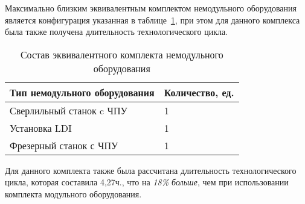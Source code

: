Максимально близким эквивалентным комплектом немодульного оборудования является конфигурация указанная в таблице~\cref{tab:equal}, при этом  для данного комплекса была также получена длительность технологического цикла.

\begin{table} [!htb]
	\centering
	\caption{Состав эквивалентного комплекта немодульного оборудования} \vspace{4pt}
	\label{tab:equal}
	\begin{threeparttable}
		\begin{tabularx}{\linewidth}{ll}
			\toprule
			Тип немодульного оборудования & Количество, ед. \\
			\midrule
			Сверлильный станок c ЧПУ & 1 \\
			Установка LDI            & 1 \\
			Фрезерный станок с ЧПУ   & 1 \\
			\bottomrule
		\end{tabularx}
	\end{threeparttable}
\end{table}


Для данного комплекта также была рассчитана длительность технологического цикла, которая составила 4,27\:ч., что на \textit{18\:\% больше}, чем при использовании комплекта модульного оборудования.



%




